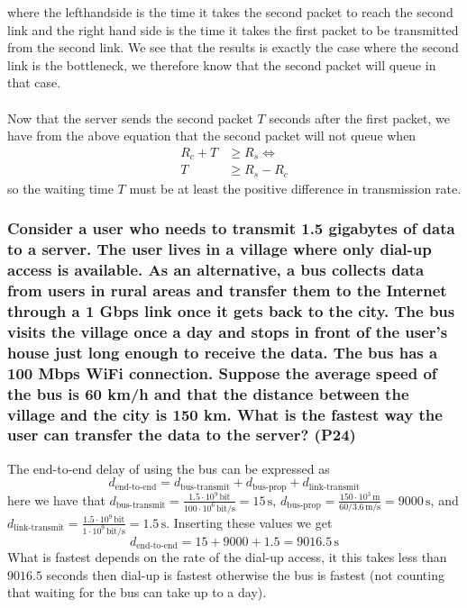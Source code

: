 where the lefthandside is the time it takes the second packet to reach the second link and the right hand side is the time it takes the first packet to be transmitted from the second link. We see that the results is exactly the case where the second link is the bottleneck, we therefore know that the second packet will queue in that case. \\
\\
Now that the server sends the second packet $T$ seconds after the first packet, we have from the above equation that the second packet will not queue when
\begin{equation*}
\begin{split}
    R_c + T & \geq R_s \Longleftrightarrow \\
    T &\geq R_s - R_c
\end{split}
\end{equation*}
so the waiting time $T$ must be at least the positive difference in transmission rate.


\subsubsection{Consider a user who needs to transmit 1.5 gigabytes of data to a server. The user lives in a village where only dial-up access is available. As an alternative, a bus collects data from users in rural areas and transfer them to the Internet through a 1 Gbps link once it gets back to the city. The bus visits the village once a day and stops in front of the user's house just long enough to receive the data. The bus has a 100 Mbps WiFi connection. Suppose the average speed of the bus is 60 km/h and that the distance between the village and the city is 150 km. What is the fastest way the user can transfer the data to the server? (P24)}

The end-to-end delay of using the bus can be expressed as
\begin{equation*}
    d_\text{end-to-end} = d_\text{bus-transmit} + d_\text{bus-prop} + d_\text{link-transmit}
\end{equation*}
here we have that $d_\text{bus-transmit} = \frac{1.5 \cdot 10^9 \, \text{bit}}{100 \cdot 10^6 \, \text{bit/s}} = 15 \, \text{s}$, $d_\text{bus-prop} = \frac{150 \cdot 10^3 \, \text{m}}{60/3.6 \, \text{m/s}} = 9000 \, \text{s}$, and $d_\text{link-transmit} = \frac{1.5 \cdot 10^9 \, \text{bit}}{1 \cdot 10^9 \, \text{bit/s}} = 1.5 \, \text{s}$. Inserting these values we get
\begin{equation*}
    d_\text{end-to-end} = 15 + 9000 + 1.5 = 9016.5 \, \text{s}
\end{equation*}
What is fastest depends on the rate of the dial-up access, it this takes less than $9016.5$ seconds then dial-up is fastest otherwise the bus is fastest (not counting that waiting for the bus can take up to a day).




